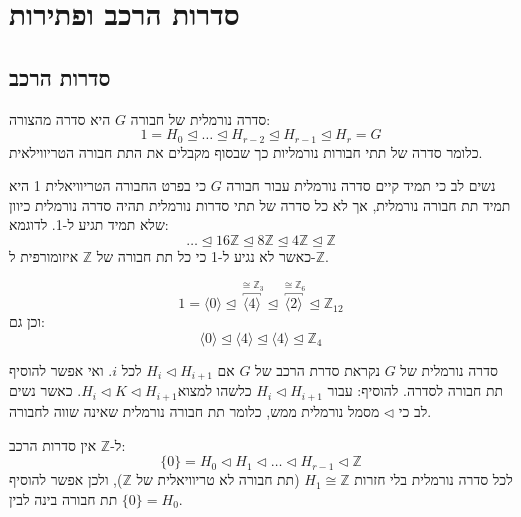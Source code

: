 \documentclass{tstextbook}
\begin{document}
\section{סדרות הרכב ופתירות}

\subsection{סדרות הרכב}

\begin{definition}
סדרה נורמלית של חבורה \(G\) היא סדרה מהצורה:
$$1=H_{0}\trianglelefteq \dots \trianglelefteq H_{r-2}\trianglelefteq H_{r-1}\trianglelefteq H_{r}=G$$
כלומר סדרה של תתי חבורות נורמליות כך שבסוף מקבלים את התת חבורה הטריווילאית.

\end{definition}
\begin{remark}
נשים לב כי תמיד קיים סדרה נורמלית עבור חבורה \(G\) כי בפרט החבורה הטריוויאלית 1 היא תמיד תת חבורה נורמלית, אך לא כל סדרה של תתי סדרות נורמלית תהיה סדרה נורמלית כיוון שלא תמיד תגיע ל-1. לדוגמא:
$$\dots \trianglelefteq 16\mathbb{Z}\trianglelefteq 8\mathbb{Z} \trianglelefteq 4\mathbb{Z}  \trianglelefteq \mathbb{Z}$$
כאשר לא נגיע ל-1 כי כל תת חבורה של \(\mathbb{Z}\) איזומורפית ל-\(\mathbb{Z}\).

\end{remark}
\begin{example}
$$1=\langle 0\rangle \trianglelefteq \overbracket{ \langle 4\rangle }^{ \cong \mathbb{Z} _{3} } \trianglelefteq \overbracket{ \langle 2\rangle  }^{ \cong \mathbb{Z} _{6} } \trianglelefteq \mathbb{Z} _{12}$$
וכן גם:
$$\langle 0\rangle \trianglelefteq \langle 4\rangle \trianglelefteq  \langle 4\rangle \trianglelefteq  \mathbb{Z} _{4}$$

\end{example}
\begin{definition}
סדרה נורמלית של \(G\) נקראת סדרת הרכב של \(G\) אם \(H_{i}\triangleleft H_{i+1}\) לכל \(i\). ואי אפשר להוסיף תת חבורה לסדרה.
להוסיף: עבור \(H_{i}\triangleleft H_{i+1}\) כלשהו למצוא\(H_{i}\triangleleft K\triangleleft H_{i+1}\). כאשר נשים לב כי \(\triangleleft\) מסמל נורמלית ממש, כלומר תת חבורה נורמלית שאינה שווה לחבורה.

\end{definition}
\begin{corollary}
ל-\(\mathbb{Z}\) אין סדרות הרכב:
$$\{ 0 \}=H_{0}\triangleleft H_{1}\triangleleft \dots \triangleleft H_{r-1}\triangleleft \mathbb{Z}$$
לכל סדרה נורמלית בלי חזרות \(H_{1}\cong\mathbb{Z}\) (תת חבורה לא טריוויאלית של \(\mathbb{Z}\)), ולכן אפשר להוסיף תת חבורה בינה לבין \(\{ 0 \}=H_{0}\).

\end{corollary}
\end{document}
